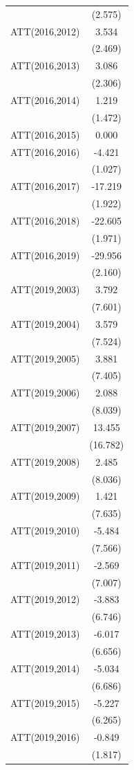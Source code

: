 \documentclass[
  12pt,
]{article}
\begin{document}
\begin{table}
\begin{tabular}[t]{lc}
 & (2.575)\\
ATT(2016,2012) & 3.534\\
 & (2.469)\\
ATT(2016,2013) & 3.086\\
 & (2.306)\\
ATT(2016,2014) & 1.219\\
 & (1.472)\\
ATT(2016,2015) & 0.000\\
ATT(2016,2016) & -4.421\\
 & (1.027)\\
ATT(2016,2017) & -17.219\\
 & (1.922)\\
ATT(2016,2018) & -22.605\\
 & (1.971)\\
ATT(2016,2019) & -29.956\\
 & (2.160)\\
ATT(2019,2003) & 3.792\\
 & (7.601)\\
ATT(2019,2004) & 3.579\\
 & (7.524)\\
ATT(2019,2005) & 3.881\\
 & (7.405)\\
ATT(2019,2006) & 2.088\\
 & (8.039)\\
ATT(2019,2007) & 13.455\\
 & (16.782)\\
ATT(2019,2008) & 2.485\\
 & (8.036)\\
ATT(2019,2009) & 1.421\\
 & (7.635)\\
ATT(2019,2010) & -5.484\\
 & (7.566)\\
ATT(2019,2011) & -2.569\\
 & (7.007)\\
ATT(2019,2012) & -3.883\\
 & (6.746)\\
ATT(2019,2013) & -6.017\\
 & (6.656)\\
ATT(2019,2014) & -5.034\\
 & (6.686)\\
ATT(2019,2015) & -5.227\\
 & (6.265)\\
ATT(2019,2016) & -0.849\\
 & (1.817)\\

\end{tabular}
\end{table}
\end{document}
